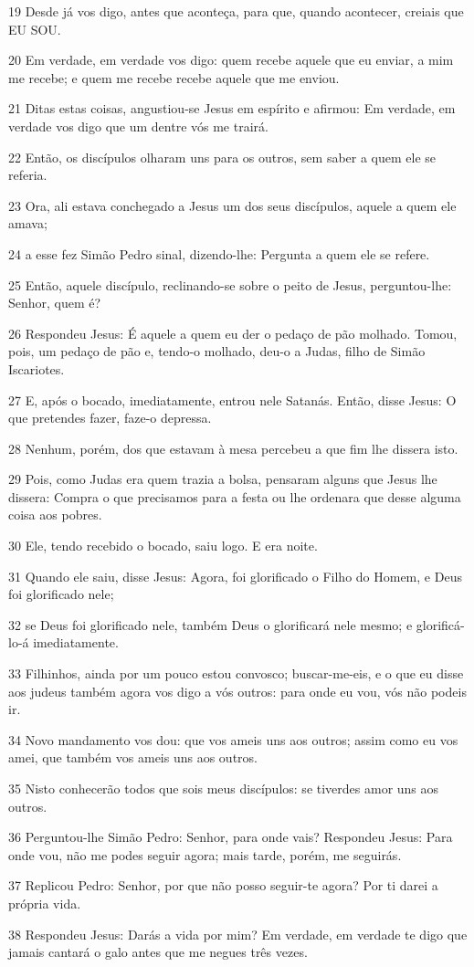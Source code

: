 \par 19 Desde já vos digo, antes que aconteça, para que, quando acontecer, creiais que EU SOU.
\par 20 Em verdade, em verdade vos digo: quem recebe aquele que eu enviar, a mim me recebe; e quem me recebe recebe aquele que me enviou.
\par 21 Ditas estas coisas, angustiou-se Jesus em espírito e afirmou: Em verdade, em verdade vos digo que um dentre vós me trairá.
\par 22 Então, os discípulos olharam uns para os outros, sem saber a quem ele se referia.
\par 23 Ora, ali estava conchegado a Jesus um dos seus discípulos, aquele a quem ele amava;
\par 24 a esse fez Simão Pedro sinal, dizendo-lhe: Pergunta a quem ele se refere.
\par 25 Então, aquele discípulo, reclinando-se sobre o peito de Jesus, perguntou-lhe: Senhor, quem é?
\par 26 Respondeu Jesus: É aquele a quem eu der o pedaço de pão molhado. Tomou, pois, um pedaço de pão e, tendo-o molhado, deu-o a Judas, filho de Simão Iscariotes.
\par 27 E, após o bocado, imediatamente, entrou nele Satanás. Então, disse Jesus: O que pretendes fazer, faze-o depressa.
\par 28 Nenhum, porém, dos que estavam à mesa percebeu a que fim lhe dissera isto.
\par 29 Pois, como Judas era quem trazia a bolsa, pensaram alguns que Jesus lhe dissera: Compra o que precisamos para a festa ou lhe ordenara que desse alguma coisa aos pobres.
\par 30 Ele, tendo recebido o bocado, saiu logo. E era noite.
\par 31 Quando ele saiu, disse Jesus: Agora, foi glorificado o Filho do Homem, e Deus foi glorificado nele;
\par 32 se Deus foi glorificado nele, também Deus o glorificará nele mesmo; e glorificá-lo-á imediatamente.
\par 33 Filhinhos, ainda por um pouco estou convosco; buscar-me-eis, e o que eu disse aos judeus também agora vos digo a vós outros: para onde eu vou, vós não podeis ir.
\par 34 Novo mandamento vos dou: que vos ameis uns aos outros; assim como eu vos amei, que também vos ameis uns aos outros.
\par 35 Nisto conhecerão todos que sois meus discípulos: se tiverdes amor uns aos outros.
\par 36 Perguntou-lhe Simão Pedro: Senhor, para onde vais? Respondeu Jesus: Para onde vou, não me podes seguir agora; mais tarde, porém, me seguirás.
\par 37 Replicou Pedro: Senhor, por que não posso seguir-te agora? Por ti darei a própria vida.
\par 38 Respondeu Jesus: Darás a vida por mim? Em verdade, em verdade te digo que jamais cantará o galo antes que me negues três vezes.


